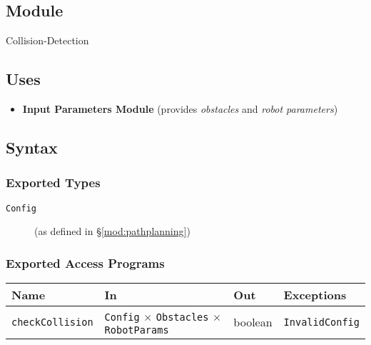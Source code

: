 \documentclass[12pt, titlepage]{article}
\begin{document}
\subsection{Module}
Collision‑Detection

\subsection{Uses}
\begin{itemize}
  \item \textbf{Input Parameters Module} (provides \textit{obstacles} and \textit{robot parameters})
\end{itemize}

\subsection{Syntax}
\subsubsection{Exported Types}
\begin{description}
  \item[\texttt{Config}] (as defined in \S\ref{mod:pathplanning})
\end{description}

\subsubsection{Exported Access Programs}
\begin{center}
\renewcommand{\arraystretch}{1.35}
\begin{tabular}{p{4.1cm} p{5.3cm} p{3.4cm} p{3.1cm}}
  \toprule
  \textbf{Name} & \textbf{In} & \textbf{Out} & \textbf{Exceptions}\\ \midrule
  \texttt{checkCollision} & \texttt{Config} $\times$ \texttt{Obstacles} $\times$ \texttt{RobotParams} & boolean & \texttt{InvalidConfig}\\
  \bottomrule
  \end{tabular}
  
\end{center}
\end{document}
